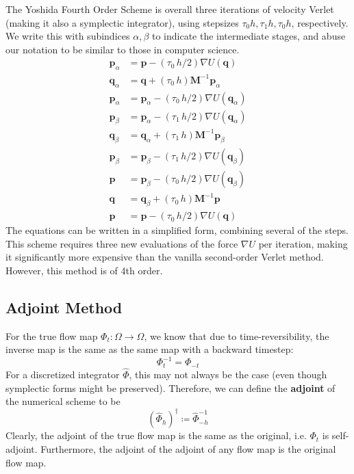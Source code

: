 \documentclass{article}
\begin{document}
      The Yoshida Fourth Order Scheme is overall three iterations of velocity Verlet (making it also a symplectic integrator), using stepsizes $\tau_0 h, \tau_1 h, \tau_0 h$, respectively. We write this with subindices $\alpha, \beta$ to indicate the intermediate stages, and abuse our notation to be similar to those in computer science. 
      \begin{align*}
        \mathbf{p}_\alpha & = \mathbf{p} - (\tau_0\, h/2) \nabla U(\mathbf{q}) \\
        \mathbf{q}_\alpha & = \mathbf{q} + (\tau_0 \, h) \mathbf{M}^{-1} \mathbf{p}_\alpha \\
        \mathbf{p}_\alpha & = \mathbf{p}_\alpha - (\tau_0 \, h / 2) \nabla U(\mathbf{q}_\alpha) \\
        \mathbf{p}_\beta & = \mathbf{p}_\alpha - (\tau_1 \, h/2) \nabla U(\mathbf{q}_\alpha) \\
        \mathbf{q}_\beta & = \mathbf{q}_\alpha + (\tau_1 \, h) \mathbf{M}^{-1} \mathbf{p}_\beta \\
        \mathbf{p}_\beta & = \mathbf{p}_\beta - (\tau_1 \, h/2) \nabla U(\mathbf{q}_\beta) \\
        \mathbf{p} & = \mathbf{p}_\beta - (\tau_0 \, h/2) \nabla U(\mathbf{q}_\beta) \\
        \mathbf{q} & = \mathbf{q}_\beta + (\tau_0 \, h) \mathbf{M}^{-1} \mathbf{p} \\
        \mathbf{p} & = \mathbf{p} - (\tau_0 \, h/2) \nabla U(\mathbf{q}) 
      \end{align*}
      The equations can be written in a simplified form, combining several of the steps. This scheme requires three new evaluations of the force $\nabla U$ per iteration, making it significantly more expensive than the vanilla second-order Verlet method. However, this method is of 4th order. 

  \subsection{Adjoint Method}

    For the true flow map $\Phi_t: \Omega \longrightarrow \Omega$, we know that due to time-reversibility, the inverse map is the same as the same map with a backward timestep: 
    \begin{equation}
      \Phi_t^{-1} = \Phi_{-t}
    \end{equation}
    For a discretized integrator $\hat{\Phi}$, this may not always be the case (even though symplectic forms might be preserved). Therefore, we can define the \textbf{adjoint} of the numerical scheme to be 
    \begin{equation}
      (\hat{\Phi}_{h})^\dagger \coloneqq \hat{\Phi}_{-h}^{-1}
    \end{equation}
    Clearly, the adjoint of the true flow map is the same as the original, i.e. $\Phi_t$ is self-adjoint. Furthermore, the adjoint of the adjoint of any flow map is the original flow map. 
\end{document}
